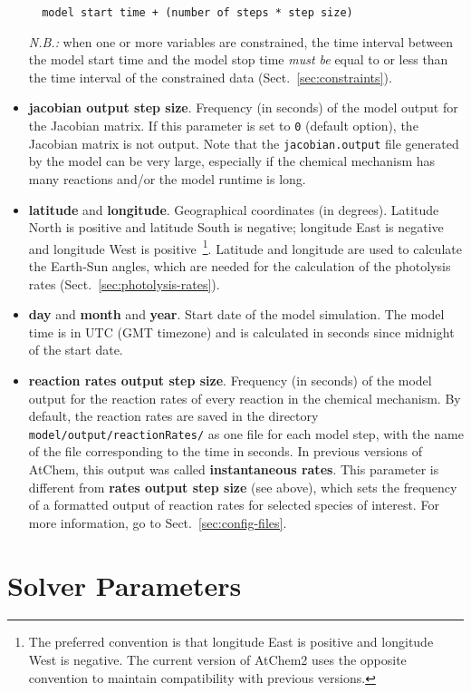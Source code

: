 \begin{itemize}
\begin{verbatim}
  model start time + (number of steps * step size)
  \end{verbatim}
  \emph{N.B.:} when one or more variables are constrained, the time
  interval between the model start time and the model stop time
  \emph{must be} equal to or less than the time interval of the
  constrained data (Sect.~\ref{sec:constraints}).
\item \textbf{jacobian output step size}. Frequency (in seconds) of
  the model output for the Jacobian matrix. If this parameter is set
  to \texttt{0} (default option), the Jacobian matrix is not
  output. Note that the \texttt{jacobian.output} file generated by the
  model can be very large, especially if the chemical mechanism has
  many reactions and/or the model runtime is long.
\item \textbf{latitude} and \textbf{longitude}. Geographical
  coordinates (in degrees). Latitude North is positive and latitude
  South is negative; longitude East is negative and longitude West is
  positive~\footnote{The preferred convention is that longitude East
    is positive and longitude West is negative. The current version of
    AtChem2 uses the opposite convention to maintain compatibility
    with previous versions.}. Latitude and longitude are used to
  calculate the Earth-Sun angles, which are needed for the calculation
  of the photolysis rates (Sect.~\ref{sec:photolysis-rates}).
\item \textbf{day} and \textbf{month} and \textbf{year}. Start date of
  the model simulation. The model time is in UTC (GMT timezone) and is
  calculated in seconds since midnight of the start date.
\item \textbf{reaction rates output step size}. Frequency (in seconds)
  of the model output for the reaction rates of every reaction in the
  chemical mechanism. By default, the reaction rates are saved in the
  directory \texttt{model/output/reactionRates/} as one file for each
  model step, with the name of the file corresponding to the time in
  seconds. In previous versions of AtChem, this output was called
  \textbf{instantaneous rates}. This parameter is different from
  \textbf{rates output step size} (see above), which sets the
  frequency of a formatted output of reaction rates for selected
  species of interest. For more information, go to
  Sect.~\ref{sec:config-files}.
\end{itemize}

\section{Solver Parameters} \label{sec:solver-parameters}

